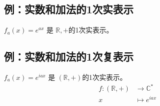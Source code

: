\subsection{例：实数和加法的1次实表示}
$f_a(x)=e^{ax}$ 是 $\mathbb R, +$的1次实表示。

\subsection{例：实数和加法的1次复表示}
$f_a(x)=e^{iax}$ 是 $(\mathbb R, +)$的1次实表示。
\begin{equation}
\label{fubiaohsi}
\begin{split}
f:(\mathbb R, +) &\to \mathbb C^*\\
x  &\mapsto e^{iax}\\
\end{split}
\end{equation}
 


